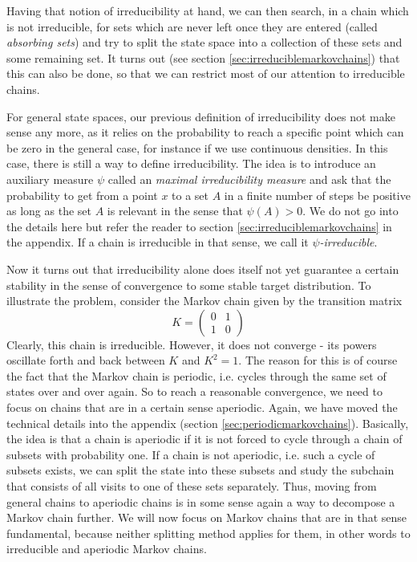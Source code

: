 \documentclass[a4paper, draft]{article}
\theoremstyle{own}
\theoremstyle{remark}
\begin{document}
Having that notion of irreducibility at hand, we can then search, in a chain which is not irreducible, for sets which are never left once they are entered (called {\em absorbing sets}) and try to split the state space into a collection of these sets and some remaining set. It turns out (see section \ref{sec:irreduciblemarkovchains}) that this can also be done, so that we can restrict most of our attention to irreducible chains.

For general state spaces, our previous definition of irreducibility does not make sense any more, as it relies on the probability to reach a specific point which can be zero in the general case, for instance if we use continuous densities. In this case, there is still a way to define irreducibility. The idea is to introduce an auxiliary measure $\psi$ called an {\em maximal irreducibility measure} and ask that the probability to get from a point $x$ to a set $A$ in a finite number of steps be positive as long as the set $A$ is relevant in the sense that $\psi(A) > 0$. We do not go into the details here but refer the reader to section \ref{sec:irreduciblemarkovchains} in the appendix. If a chain is irreducible in that sense, we call it {\em $\psi$-irreducible}.


Now it turns out that irreducibility alone does itself not yet guarantee a certain stability in the sense of convergence to some stable target distribution. To illustrate the problem, consider the Markov chain given by the transition matrix
$$
K = \begin{pmatrix} 0 & 1 \\ 1 & 0 \end{pmatrix}
$$
Clearly, this chain is irreducible. However, it does not converge - its powers oscillate forth and back between $K$ and $K^2 = 1$. The reason for this is of course the fact that the Markov chain is periodic, i.e. cycles through the same set of states over and over again. So to reach a reasonable convergence, we need to focus on chains that are in a certain sense aperiodic. Again, we have moved the technical details into the appendix (section \ref{sec:periodicmarkovchains}). Basically, the idea is that a chain is aperiodic if it is not forced to cycle through a chain of subsets with probability one. If a chain is not aperiodic, i.e. such a cycle of subsets exists, we can split the state into these subsets and study the subchain that consists of all visits to one of these sets separately. Thus, moving from general chains to aperiodic chains is in some sense again a way to decompose a Markov chain further.
We will now focus on Markov chains that are in that sense fundamental, because neither splitting method applies for them, in other words to irreducible and aperiodic Markov chains.
\end{document}
